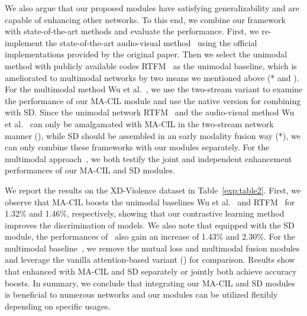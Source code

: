 \documentclass[sigconf]{acmart}
\begin{document}
We also argue that our proposed modules have satisfying generalizability and are capable of enhancing other networks. To this end, we combine our framework with state-of-the-art methods and evaluate the performance. First, we re-implement the state-of-the-art audio-visual method~\cite{pang2021violence} using the official implementations provided by the original paper. Then we select the unimodal method with publicly available codes RTFM~\cite{tian2021weakly} as the unimodal baseline, which is ameliorated to multimodal networks by two means we mentioned above (* and ). For the multimodal method Wu et al.~\cite{wu2020not}, we use the two-stream variant to examine the performance of our MA-CIL module and use the native version for combining with SD. Since the unimodal network RTFM~\cite{tian2021weakly} and the audio-visual method Wu et al.~\cite{wu2020not} can only be amalgamated with MA-CIL in the two-stream network manner (), while SD should be assembled in an early modality fusion way (*), we can only combine these frameworks with our modules separately. For the multimodal approach~\cite{pang2021violence}, we both testify the joint and independent enhancement performances of our MA-CIL and SD modules.

\begin{table}[t]
\caption{Ablation studies on different components of our proposed framework.}
\end{table}

We report the results on the XD-Violence dataset in Table~\ref{exp:table2}. First, we observe that MA-CIL boosts the unimodal baselines Wu et al.~\cite{wu2020not} and RTFM~\cite{tian2021weakly} for 1.32\% and 1.46\%, respectively, showing that our contrastive learning method improves the discrimination of models. We also note that equipped with the SD module, the performances of~\cite{wu2020not, tian2021weakly} also gain an increase of 1.43\% and 2.30\%. For the multimodal baseline~\cite{pang2021violence}, we remove the mutual loss and multimodal fusion modules and leverage the vanilla attention-based variant () for comparison. Results show that enhanced with MA-CIL and SD separately or jointly both achieve accuracy boosts. In summary, we conclude that integrating our MA-CIL and SD modules is beneficial to numerous networks and our modules can be utilized flexibly depending on specific usages. 
\end{document}
